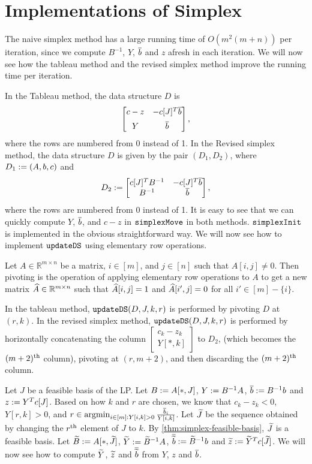 \section{Implementations of Simplex}

The naive simplex method has a large running time of $O(m^2(m + n))$ per iteration,
since we compute $B^{-1}$, $Y$, $\overline{b}$ and $z$ afresh in each iteration.
We will now see how the tableau method and the revised simplex method
improve the running time per iteration.

In the Tableau method, the data structure $D$ is
\[ \begin{bmatrix} c - z & -c[J]^T\overline{b} \\[0.5em] Y & \overline{b} \end{bmatrix}, \]
where the rows are numbered from 0 instead of 1.
In the Revised simplex method, the data structure $D$ is given by
the pair $(D_1, D_2)$, where $D_1 := (A, b, c)$ and
\[ D_2 := \begin{bmatrix} c[J]^TB^{-1} & -c[J]^T\overline{b} \\ B^{-1} & \overline{b} \end{bmatrix}, \]
where the rows are numbered from 0 instead of 1.
It is easy to see that we can quickly compute $Y$, $\overline{b}$, and $c-z$
in $\operatorname{\mathtt{simplexMove}}$ in both methods.
$\operatorname{\mathtt{simplexInit}}$ is implemented in the obvious straightforward way.
We will now see how to implement $\operatorname{\mathtt{updateDS}}$ using elementary row operations.

\begin{definition}[pivoting]
Let $A \in \mathbb{R}^{m \times n}$ be a matrix, $i \in [m]$, and $j \in [n]$
such that $A[i, j] \neq 0$. Then pivoting is the operation of applying
elementary row operations to $A$ to get a new matrix $\widehat{A} \in \mathbb{R}^{m \times n}$
such that $\widehat{A}[i, j] = 1$ and $\widehat{A}[i', j] = 0$ for all $i' \in [m] - \{i\}$.
\end{definition}

In the tableau method, $\operatorname{\mathtt{updateDS}}(D, J, k, r)$ is performed by pivoting $D$ at $(r, k)$.
In the revised simplex method, $\operatorname{\mathtt{updateDS}}(D, J, k, r)$ is performed by
horizontally concatenating the column
$\begin{bmatrix}c_k - z_k \\ Y[*, k] \end{bmatrix}$ to $D_2$,
(which becomes the $(m+2)^{\textrm{th}}$ column), pivoting at $(r, m+2)$,
and then discarding the $(m+2)^{\textrm{th}}$ column.

Let $J$ be a feasible basis of the LP.
Let $B := A[*,J]$, $Y := B^{-1}A$, $\overline{b} := B^{-1}b$ and $z := Y^Tc[J]$.
Based on how $k$ and $r$ are chosen, we know that $c_k - z_k < 0$,
$Y[r,k] > 0$, and $r \in \operatorname*{argmin}_{i \in [m]: Y[i,k] > 0} \frac{\overline{b}_i}{Y[i,k]}$.
Let $\widetilde{J}$ be the sequence obtained by changing the $r^{\textrm{th}}$ element of $J$ to $k$.
By \cref{thm:simplex-feasible-basis}, $\widetilde{J}$ is a feasible basis.
Let $\widetilde{B} := A[*,\widetilde{J}]$, $\widetilde{Y} := \widetilde{B}^{-1}A$, $\overline{\widetilde{b}} := \widetilde{B}^{-1}b$
and $\widetilde{z} := \widetilde{Y}^Tc[\widetilde{J}]$.
We will now see how to compute $\widetilde{Y}$, $\widetilde{z}$ and $\overline{\widetilde{b}}$
from $Y$, $z$ and $\overline{b}$.

